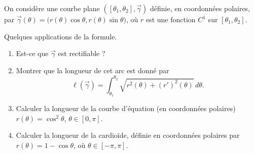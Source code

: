 \begin{exercice}\label{exoCourbesSurfaces0007}

On considère une courbe plane $([\theta_1, \theta _2], \vec{\gamma})$ définie, en coordonnées polaires, par $\vec{\gamma} (\theta ) = \big( r( \theta) \cos \theta, r( \theta) \sin \theta \big) $, où $r$ est une fonction $C^1$ sur $[\theta_1, \theta _2]$. 

Quelques applications de la formule.

\begin{enumerate}
	\item
		Est-ce que $ \vec{\gamma}$ est rectifiable ? 
	\item
		Montrer que la longueur de cet arc est donné par
		\begin{equation}		\label{EqFormDemExotLpola}
			\ell( \vec{\gamma}) = \int_{\theta_1}^{\theta _2} \sqrt{ r^2 ( \theta ) + (r')^2 ( \theta ) }\, d \theta. 
		\end{equation}
		
	\item
		Calculer la longueur de la courbe d'équation (en coordonnées polaires) $ r( \theta ) = \cos ^2 \theta$, $ \theta \in [0, \pi]$. 

	\item
		Calculer la longueur de la cardioïde, définie en coordonnées polaires par $ r( \theta ) = 1 - \cos \theta$, où $ \theta \in [- \pi,  \pi]$.  
		
\end{enumerate}

\end{exercice}
